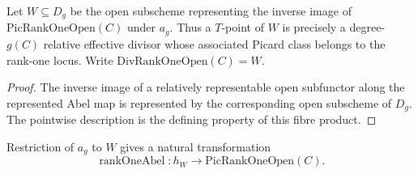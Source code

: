 \begin{definition}
  \label{def:divRankOneOpen}
  \notready
  Let \(W\subseteq D_g\) be the open subscheme representing the inverse image of
  \(\mathrm{PicRankOneOpen}(C)\) under \(a_g\).  Thus a \(T\)-point of \(W\) is precisely a
  degree-\(g(C)\) relative effective divisor whose associated Picard class belongs to the
  rank-one locus.  Write \(\mathrm{DivRankOneOpen}(C)=W\).
\end{definition}
\begin{proof}
  The inverse image of a relatively representable open subfunctor along the represented Abel
  map is represented by the corresponding open subscheme of \(D_g\).  The pointwise
  description is the defining property of this fibre product.
\end{proof}

\begin{definition}
  \label{def:rankOneAbel}
  \notready
  Restriction of \(a_g\) to \(W\) gives a natural transformation
  \[
    \operatorname{rankOneAbel}\colon
      h_W\longrightarrow\mathrm{PicRankOneOpen}(C).
  \]
\end{definition}

